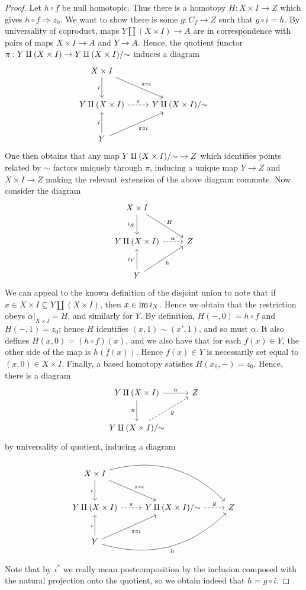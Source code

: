\begin{proof}
	Let $h\circ f$ be null homotopic. Thus there is a homotopy $H : X\times I \to Z$ which gives $h\circ f\Rightarrow z_0$. We want to show there is some $g : C_f \to Z$ such that $g\circ i=h$. By universality of coproduct, maps $Y\amalg (X\times I) \to A$ are in correspondence with pairs of maps $X\times I\to A$ and $Y\to A$. Hence, the quotient functor $\pi : Y\amalg (X\times I) \to Y\amalg (X\times I) /\mathbin{\sim}$ induces a diagram
	\[\begin{tikzcd}[row sep = 2.5em, column sep = 2.5em]
	X\times I\ar[" i "', d] \ar[" \pi\circ i ", dr]  & \\
	Y\amalg (X\times I)\ar[" \pi ", dashed, r] & Y\amalg (X\times I) /\tildesim & \\
	Y\ar[" i ", u] \ar[" \pi\circ i "', ur]  &
	\end{tikzcd}\]
	One then obtains that any map $Y\amalg (X\times I) /\mathbin{\sim}\to Z $ which identifies points related by $\sim $ factors uniquely through $\pi$, inducing a unique map $Y\to Z$ and $X\times I\to Z$ making the relevant extension of the above diagram commute. Now consider the diagram
	\[\begin{tikzcd}[row sep = 2.5em, column sep = 2.5em]
	X\times I\ar[" i_X "', d] \ar[" H ", dr]  &  \\
	Y\amalg (X\times I)\ar[" \alpha ", dashed, r]  & Z \\
	Y\ar[" i_Y ", u] \ar[" h "', ur]  & 
	\end{tikzcd}\]
	We can appeal to the known definition of the disjoint union to note that if $x\in X\times I\subseteq Y\amalg (X\times I)$, then $x\in\operatorname{im} i_X$. Hence we obtain that the restriction obeys $\alpha|_{X\times I}=H$, and similarly for $Y$. By definition, $H(-,0)=h\circ f$ and $H(-,1)=z_0$; hence $H$ identifies $(x,1)\sim (x',1)$, and so must $\alpha$. It also defines $H(x,0)=(h\circ f)(x)$, and we also have that for each $f(x)\in Y$, the other side of the map is $h(f(x))$. Hence $f(x)\in Y$ is necessarily set equal to $(x,0)\in X\times I$. Finally, a based homotopy satisfies $H(x_0,-)=z_0$. Hence, there is a diagram
	\[\begin{tikzcd}[row sep = 2.5em, column sep = 2.5em]
	Y\amalg (X\times I)\ar[" \pi "', d] \ar[" \alpha ", r]  & Z \\
	 Y\amalg (X\times I) /\tildesim \ar[" g "', dashed, ur] & 
	\end{tikzcd}\]
	by universality of quotient, inducing a diagram
	\[\begin{tikzcd}[row sep = 2.5em, column sep = 2.5em]
	X\times I\ar[" i "', d] \ar[" \pi\circ i ", dr]\ar[bend left, drr]   & \\
	Y\amalg (X\times I)\ar[" \pi ", dashed, r] & Y\amalg (X\times I) /\tildesim \ar[" g ", dashed, r] & Z\\
	Y\ar[" i ", u] \ar[" \pi\circ i "', ur] \ar[" h "', bend right, urr] &
	\end{tikzcd}\]
	Note that by $i^*$ we really mean postcomposition by the inclusion composed with the natural projection onto the quotient, so we obtain indeed that $h=g\circ i$.


\end{proof}
